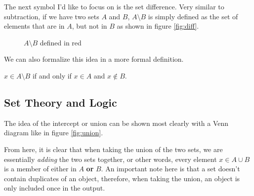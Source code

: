 The next symbol I'd like to focus on is the set difference. Very similar to subtraction, if we have two sets $A$ and $B$, $A\setminus B$ is simply defined as the set of elements that are in $A$, but not in $B$ as shown in figure \eqref{fig:diff}.
\begin{figure}[h]
\centering
{}
	\caption{$A\setminus B$ defined in red}
	\label{fig:diff}
\end{figure}

We can also formalize this idea in a more formal definition.

\begin{define}
	$x\in A\setminus B$ if and only if $x\in A$ and $x\notin B$.
\end{define}


\subsection{Set Theory and Logic}
The idea of the intercept or union can be shown most clearly with a Venn diagram like in figure \eqref{fig:union}.
\begin{figure}[h]
\centering
{}
	\caption{}
	\label{fig:union}
\end{figure}
From here, it is clear that when taking the union of the two sets, we are essentially \textit{adding} the two sets together, or other words, every element $x\in A\cup B$ is a member of either in $A$ \textbf{or} $B$.
An important note here is that a set doesn't contain duplicates of an object, therefore, when taking the union, an object is only included once in the output.

